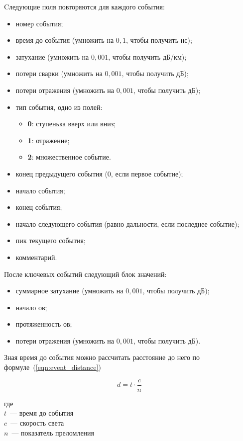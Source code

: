 Cледующие поля повторяются для каждого события:
\begin{itemize}
  \item номер события;
  \item время до события (умножить на $0,1$, чтобы получить нс);
  \item затухание (умножить на $0,001$, чтобы получить дБ/км);
  \item потери сварки (умножить на $0,001$, чтобы получить дБ);
  \item потери отражения (умножить на $0,001$, чтобы получить дБ);
  \item тип события, одно из полей:
  \begin{itemize}
    \item \textbf{0}: ступенька вверх или вниз;
    \item \textbf{1}: отражение;
    \item \textbf{2}: множественное событие.
  \end{itemize}
  \item конец предыдущего события (0, если первое событие);
  \item начало события;
  \item конец события;
  \item начало следующего события (равно дальности, если последнее событие);
  \item пик текущего события;
  \item комментарий.
\end{itemize}

После ключевых событий следующий блок значений:
\begin{itemize}
  \item суммарное затухание (умножить на $0,001$, чтобы получить дБ);
  \item начало \acrshort{ов};
  \item протяженность \acrshort{ов};
  \item потери отражения (умножить на $0,001$, чтобы получить дБ).
\end{itemize}

Зная время до события можно рассчитать расстояние до него по формуле~(\ref{eqn:event_distance})

\begin{equation}
  \label{eqn:event_distance}
  d = t \cdot \frac{c}{n}
\end{equation}

\noindent где \\
$t$~--- время до события \\
$c$~--- скорость света \\
$n$~--- показатель преломления

